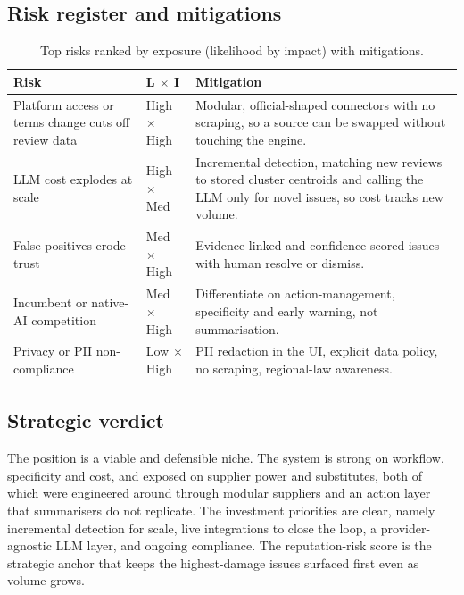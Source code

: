 \documentclass[11pt,a4paper]{article}
\begin{document}
\subsection{Risk register and mitigations}
\begin{table}[H]
\centering
\caption{Top risks ranked by exposure (likelihood by impact) with mitigations.}
\label{tab:riskreg}
\renewcommand{\arraystretch}{1.2}
\begin{tabularx}{\linewidth}{p{3.4cm}p{1.7cm}X}
\toprule
\textbf{Risk} & \textbf{L $\times$ I} & \textbf{Mitigation} \\
\midrule
Platform access or terms change cuts off review data & High $\times$ High & Modular, official-shaped
connectors with no scraping, so a source can be swapped without touching the engine. \\
LLM cost explodes at scale & High $\times$ Med & Incremental detection, matching new reviews to stored
cluster centroids and calling the LLM only for novel issues, so cost tracks new volume. \\
False positives erode trust & Med $\times$ High & Evidence-linked and confidence-scored issues with
human resolve or dismiss. \\
Incumbent or native-AI competition & Med $\times$ High & Differentiate on action-management, specificity
and early warning, not summarisation. \\
Privacy or PII non-compliance & Low $\times$ High & PII redaction in the UI, explicit data policy, no
scraping, regional-law awareness. \\
\bottomrule
\end{tabularx}
\end{table}

\subsection{Strategic verdict}
The position is a viable and defensible niche. The system is strong on workflow, specificity and cost,
and exposed on supplier power and substitutes, both of which were engineered around through modular
suppliers and an action layer that summarisers do not replicate. The investment priorities are clear,
namely incremental detection for scale, live integrations to close the loop, a provider-agnostic LLM
layer, and ongoing compliance. The reputation-risk score is the strategic anchor that keeps the
highest-damage issues surfaced first even as volume grows.

\end{document}
